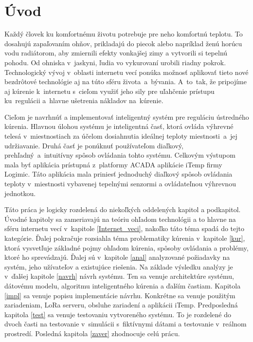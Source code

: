 \chapter{Úvod}
Každý človek ku komfortnému životu potrebuje pre neho komfortnú teplotu. 
To dosahujú zapaľovaním ohňov, prikladajú do piecok alebo napríklad ženú horúcu vodu radiátorom, aby zmiernili efekty vonkajšej zimy a vytvorili si tepelnú pohodu. 
Od ohniska v~jaskyni, ľudia vo vykurovaní urobili riadny pokrok. 
Technologický vývoj v~oblasti internetu vecí ponúka možnosť aplikovať tieto nové bezdrôtové technológie aj na túto sféru života~a~bývania. 
A~to~tak, že pripojíme aj kúrenie k~internetu s~cieľom využiť jeho sily pre uľahčenie prístupu ku~regulácii a~hlavne ušetrenia nákladov na~kúrenie. 

Cieľom je navrhnúť a implementovať inteligentný systém pre reguláciu ústredného kúrenia. 
Hlavnou úlohou systému je inteligentná časť, ktorá ovláda výhrevné telesá v~miestnostiach za účelom dosiahnutia ideálnej teploty miestnosti~a~jej udržiavanie. 
Druhá časť je ponúknuť používateľom diaľkový, prehľadný~a~intuitívny spôsob ovládania tohto systému. 
Celkovým výstupom mala byť aplikácia prístupná z~platformy ACADA aplikácie iTemp firmy Logimic. 
Táto aplikácia mala priniesť jednoduchý diaľkový spôsob ovládania teploty v~miestnosti vybavenej tepelnými senzormi a ovládateľnou výhrevnou jednotkou.

Táto práca je logicky rozdelená do niekoľkých oddelených kapitol a podkapitol. 
Úvodné kapitoly sa zameriavajú na teóriu ohľadom technológii a to hlavne na sféru internetu vecí v~kapitole \ref{Internet_veci}, nakoľko táto téma spadá do tejto kategórie. 
Ďalej pokračuje rozsiahla téma problematiky kúrenia v~kapitole \ref{kur}, ktorá vysvetľuje základné pojmy ohľadom kúrenia, spôsoby ovládania a problémy, ktoré ho sprevádzajú. 
Ďalej sú v~kapitole \ref{anal} analyzované požiadavky na systém, jeho užívateľov a existujúce riešenia. 
Na základe výsledku analýzy je v~ďalšej kapitole \ref{navrh} návrh systému. 
Ten sa venuje architektúre systému, dátovému modelu, algoritmu inteligentného kúrenia a ďalším častiam.
Kapitola \ref{impl} sa venuje popisu implementácie návrhu. 
Konkrétne sa venuje použitým zariadeniam, LoRa serveru, obsluhe zariadení a aplikácii iTemp. 
Predposledná kapitola \ref{test} sa venuje testovaniu vytvoreného systému. 
To je rozdelené do dvoch časti na testovanie v~simulácii s~fiktívnymi dátami a testovanie v~reálnom prostredí.
Posledná kapitola \ref{zaver} zhodnocuje celú prácu.